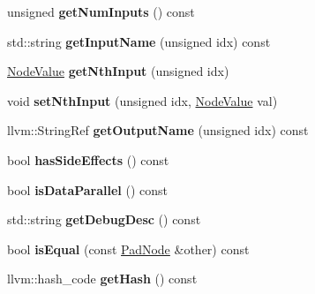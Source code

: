 \begin{DoxyCompactItemize}
\item 
\mbox{\label{classglow_1_1_pad_node_ac3ebcc2e8c1d3121fcd07d261c641fab}} 
unsigned {\bfseries get\+Num\+Inputs} () const
\item 
\mbox{\label{classglow_1_1_pad_node_acf5315bb6663ca2062ad25c9b95babd8}} 
std\+::string {\bfseries get\+Input\+Name} (unsigned idx) const
\item 
\mbox{\label{classglow_1_1_pad_node_ae1e28c278dd48cc0c0413e2183ad624f}} 
\hyperlink{structglow_1_1_node_value}{Node\+Value} {\bfseries get\+Nth\+Input} (unsigned idx)
\item 
\mbox{\label{classglow_1_1_pad_node_a7a2e2e00052c205cd9e82c883db077f5}} 
void {\bfseries set\+Nth\+Input} (unsigned idx, \hyperlink{structglow_1_1_node_value}{Node\+Value} val)
\item 
\mbox{\label{classglow_1_1_pad_node_a9f842f0427e9844b3eb3f50d2a69a675}} 
llvm\+::\+String\+Ref {\bfseries get\+Output\+Name} (unsigned idx) const
\item 
\mbox{\label{classglow_1_1_pad_node_a4a87ae528b202384fc27496b146d9d8c}} 
bool {\bfseries has\+Side\+Effects} () const
\item 
\mbox{\label{classglow_1_1_pad_node_a558a1f6f2bb942fa46936e225b06aa84}} 
bool {\bfseries is\+Data\+Parallel} () const
\item 
\mbox{\label{classglow_1_1_pad_node_a6c4f353a8b69be99b017c8817680efc2}} 
std\+::string {\bfseries get\+Debug\+Desc} () const
\item 
\mbox{\label{classglow_1_1_pad_node_a643b7108576383faa45ee336c3bab80d}} 
bool {\bfseries is\+Equal} (const \hyperlink{classglow_1_1_pad_node}{Pad\+Node} \&other) const
\item 
\mbox{\label{classglow_1_1_pad_node_ac7fa291d4655313d4a995f71ce751ea3}} 
llvm\+::hash\+\_\+code {\bfseries get\+Hash} () const
\item 

\end{DoxyCompactItemize}
